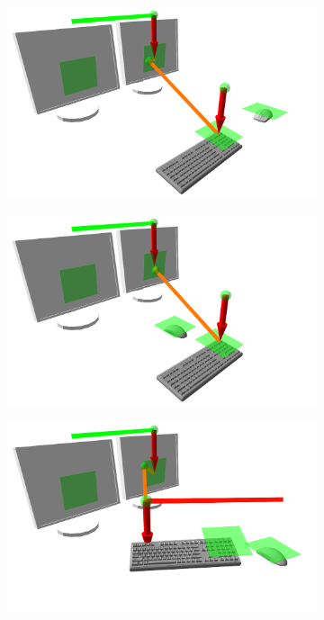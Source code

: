 \begin{figure}
\begin{center}
\begin{subfigure}[b]{.3\textwidth}
  \end{subfigure}
  \begin{subfigure}[b]{.3\textwidth}
    \includegraphics[width=1\linewidth]{bilder/paper_fotos/s10.png}
  \end{subfigure}
  \begin{subfigure}[b]{.3\textwidth}
    \includegraphics[width=1\linewidth]{bilder/paper_fotos/s11.png}
  \end{subfigure}
  \begin{subfigure}[b]{.3\textwidth}
    \includegraphics[width=1\linewidth]{bilder/paper_fotos/s12.png}

\end{subfigure}
\end{center}
\end{figure}
